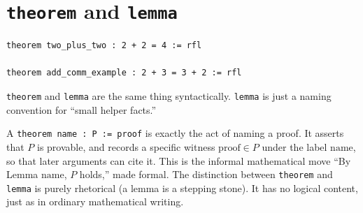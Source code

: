 \section{\texorpdfstring{\texttt{theorem} and \texttt{lemma}}{theorem and lemma}}\label{sec:03-propositions-and-proofs:03-theorem-lemma:1}

\begin{lstlisting}
theorem two_plus_two : 2 + 2 = 4 := rfl

theorem add_comm_example : 2 + 3 = 3 + 2 := rfl
\end{lstlisting}

\texttt{theorem} and \texttt{lemma} are the same thing syntactically. \texttt{lemma} is just a naming convention for ``small helper facts.''

\begin{mathreading}

A \texttt{theorem name : P := proof} is exactly the act of naming a proof. It asserts that \(P\) is provable, and records a specific witness \(\mathrm{proof} \in P\) under the label \(\mathrm{name}\), so that later arguments can cite it. This is the informal mathematical move ``By Lemma \(\mathrm{name}\), \(P\) holds,'' made formal. The distinction between \texttt{theorem} and \texttt{lemma} is purely rhetorical (a lemma is a stepping stone). It has no logical content, just as in ordinary mathematical writing.

\end{mathreading}
